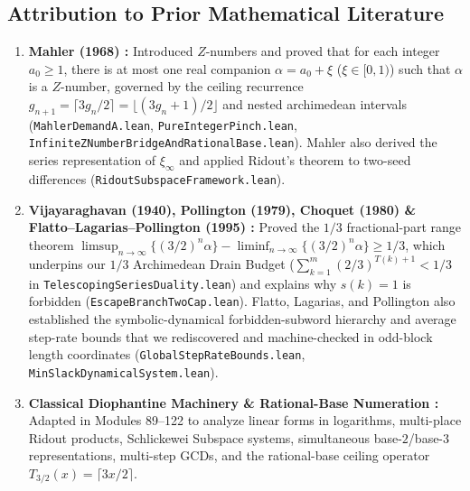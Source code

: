 \documentclass[11pt]{article}
\begin{document}
\subsection{Attribution to Prior Mathematical Literature}
\begin{enumerate}
  \item \textbf{Mahler (1968) \cite{Mah68}:} Introduced $Z$-numbers and proved that for each integer $a_0 \ge 1$, there is at most one real companion $\alpha = a_0 + \xi$ ($\xi \in [0, 1)$) such that $\alpha$ is a $Z$-number, governed by the ceiling recurrence $g_{n+1} = \lceil 3 g_n / 2 \rceil = \lfloor (3 g_n + 1)/2 \rfloor$ and nested archimedean intervals (\texttt{MahlerDemandA.lean}, \texttt{PureIntegerPinch.lean}, \texttt{InfiniteZNumberBridgeAndRationalBase.lean}). Mahler also derived the series representation of $\xi_\infty$ and applied Ridout's theorem \cite{Rid57} to two-seed differences (\texttt{RidoutSubspaceFramework.lean}).
  \item \textbf{Vijayaraghavan (1940), Pollington (1979), Choquet (1980) \& Flatto--Lagarias--Pollington (1995) \cite{Vij40,Pol79,Cho80,FLP95}:} Proved the $1/3$ fractional-part range theorem $\limsup_{n\to\infty} \{(3/2)^n \alpha\} - \liminf_{n\to\infty} \{(3/2)^n \alpha\} \ge 1/3$, which underpins our $1/3$ Archimedean Drain Budget ($\sum_{k=1}^m (2/3)^{T(k)+1} < 1/3$ in \texttt{TelescopingSeriesDuality.lean}) and explains why $s(k) = 1$ is forbidden (\texttt{EscapeBranchTwoCap.lean}). Flatto, Lagarias, and Pollington also established the symbolic-dynamical forbidden-subword hierarchy and average step-rate bounds that we rediscovered and machine-checked in odd-block length coordinates (\texttt{GlobalStepRateBounds.lean}, \texttt{MinSlackDynamicalSystem.lean}).
  \item \textbf{Classical Diophantine Machinery \cite{Rid57,Sch77,Ste80,BW93,Mat00,CZ02,CZ03,AB07,Dub06} \& Rational-Base Numeration \cite{AFS08,AEV25}:} Adapted in Modules 89--122 to analyze linear forms in logarithms, multi-place Ridout products, Schlickewei Subspace systems, simultaneous base-$2$/base-$3$ representations, multi-step GCDs, and the rational-base ceiling operator $T_{3/2}(x) = \lceil 3x/2 \rceil$.
\end{enumerate}
\end{document}
